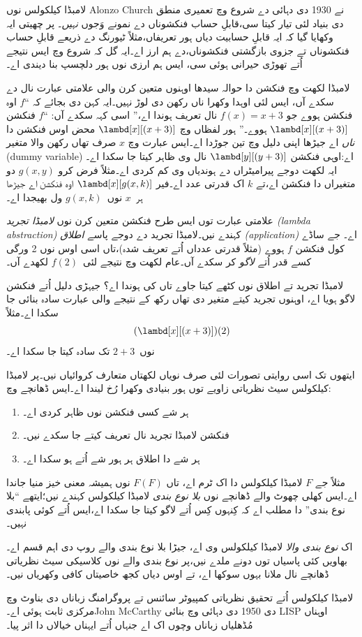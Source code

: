 \documentclass[../../../include/open-logic-section]{subfiles}
\begin{document}

لامبڈا کیلکولس نوں Alonzo Church نے 1930 دی دہائی دے شروع وچ
تعمیری منطق دی بنیاد لئی تیار کیتا سی،قابلِ حساب فنکشوناں دے نمونے
وَجوں \emph{نہیں}۔ پر چھیتی ایہ وکھایا گیا کہ ایہ قابلِ حسابیت دیاں
ہور تعریفاں،مثلاً ٹیورنگ دے ذریعے قابلِ حساب فنکشوناں تے جزوی بازگشتی
فنکشوناں،دے ہم ارز اے۔ایہ گل کہ شروع وچ ایس نتیجے اُتے تھوڑی حیرانی
ہوئی سی، ایس ہم ارزی نوں ہور دلچسپ بنا دیندی اے۔

لامبڈا لکھت وچ فنکشن دا حوالہ سیدھا اوہنوں متعین کرن والی
علامتی عبارت نال دے سکدے آں، ایس لئی اوہدا وکھرا ناں رکھن دی لوڑ نہیں۔ایہ کہن دی بجائے کہ ``$f$ اوہ فنکشن ہووے جو
$f(x) = x + 3$ نال تعریف ہوندا اے،'' اسی کہہ سکدے آں:
``$f$ فنکشن $\lambd[x][(x + 3)]$ ہووے۔'' ہور لفظاں وچ
$\lambd[x][(x+3)]$ محض اوس فنکشن دا \emph{ناں} اے جیڑھا اپنی
دلیل وچ تین جوڑدا اے۔ایس عبارت وچ $x$ صرف تھاں رکھن والا متغیر
(dummy variable) اے:اوہی فنکشن $\lambd[y][(y + 3)]$ نال وی
ظاہر کیتا جا سکدا اے۔ایہ لکھت دوجے پیرامیٹراں دے ہوندیاں وی کم
کردی اے۔مثلاً فرض کرو $g(x, y)$ دو متغیراں دا فنکشن اے،تے $k$
اک قدرتی عدد اے۔فیر $\lambd[x][g(x,k)]$ اوہ فنکشن اے جیڑھا
ہر~$x$ نوں~$g(x, k)$ ول بھیجدا اے۔

علامتی عبارت توں ایس طرح فنکشن متعین کرن نوں \emph{لامبڈا تجرید
(lambda abstraction)} کہندے نیں۔لامبڈا تجرید دے دوجے پاسے
\emph{اطلاق (application)} اے۔ جے ساڈے کول فنکشن $f$ ہووے
(مثلاً قدرتی عدداں اُتے تعریف شدہ)،تاں اسی اوس نوں 2 ورگی کسے
قدر اُتے \emph{لاگو} کر سکدے آں۔عام لکھت وچ نتیجے لئی~$f(2)$
لکھدے آں۔

لامبڈا تجرید تے اطلاق نوں کٹھے کیتا جاوے تاں کی ہوندا اے؟ جیہڑی دلیل اُتے فنکشن لاگو ہویا اے، اوہنوں تجرید
کیتے متغیر دی تھاں رکھ کے نتیجے والی عبارت سادہ بنائی
جا سکدا اے۔مثلاً
\[
(\lambd[x][(x + 3)])(2)
\]
نوں~$2 + 3$ تک سادہ کیتا جا سکدا اے۔

ایتھوں تک اسی روایتی تصورات لئی صرف نویاں لکھتاں متعارف کروائیاں
نیں۔پر لامبڈا کیلکولس سیٹ نظریاتی زاویے توں ہور بنیادی وکھرا رُخ
لیندا اے۔ایس ڈھانچے وچ:
\begin{enumerate}
\item ہر شے کسی فنکشن نوں ظاہر کردی اے۔
\item فنکشن لامبڈا تجرید نال تعریف کیتے جا سکدے نیں۔
\item ہر شے دا اطلاق ہر ہور شے اُتے ہو سکدا اے۔
\end{enumerate}
مثلاً جے $F$ لامبڈا کیلکولس دا اک ٹرم اے، تاں $F(F)$ نوں
ہمیشہ معنی خیز منیا جاندا اے۔ایس کھلی چھوٹ والے ڈھانچے نوں
\emph{بلا نوع بندی} لامبڈا کیلکولس کہندے نیں؛ایتھے ``بلا نوع بندی''
دا مطلب اے کہ کِنہوں کِس اُتے لاگو کیتا جا سکدا اے،ایس اُتے کوئی
پابندی نہیں۔

\begin{digress}
اک \emph{نوع بندی والا} لامبڈا کیلکولس وی اے، جیڑا بلا نوع بندی
والے روپ دی اہم قسم اے۔بھاویں کئی پاسیاں توں دونے ملدے نیں،پر نوع
بندی والے نوں کلاسیکی سیٹ نظریاتی ڈھانچے نال ملانا بہوں سوکھا اے،
تے اوس دیاں کجھ خاصیتاں کافی وکھریاں نیں۔

لامبڈا کیلکولس اُتے تحقیق نظریاتی کمپیوٹر سائنس تے پروگرامنگ
زباناں دی بناوٹ وچ مرکزی ثابت ہوئی اے۔John McCarthy دی 1950 دی
دہائی وچ بنائی LISP اوہناں مُڈھلیاں زباناں وچوں اک اے جنہاں اُتے ایہناں خیالاں دا اثر پیا۔
\end{digress}
\end{document}

